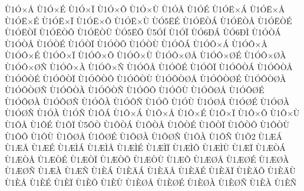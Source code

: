 {^^d91^^d3^^d7^^c5
^^d91^^d3^^d7^^c9
^^d91^^d3^^d7^^cf
^^d91^^d3^^d7^^d5
^^d91^^d3^^d7^^d9
^^d91^^d3^^c5
^^d91^^d3^^c9
^^d91^^d3^^cb^^d7^^c1
^^d91^^d3^^cb^^d7^^c5
^^d91^^d3^^cb^^d7^^c9
^^d91^^d3^^cb^^d7^^cf
^^d91^^d3^^cb^^d7^^d5
^^d91^^d3^^cb^^d7^^d9
^^d9^^d35^^cb^^c9
^^d91^^d3^^cb^^d2^^c1
^^d91^^d3^^cb^^d2^^c5
^^d91^^d3^^cb^^d2^^c9
^^d91^^d3^^cb^^d2^^cf
^^d91^^d3^^cb^^d2^^d5
^^d91^^d3^^cb^^d2^^d9
^^d9^^d35^^cb^^d5
^^d95^^d3^^cd
^^d91^^d3^^cf
^^d9^^d36^^d0^^c1
^^d9^^d36^^d0^^cc
^^d91^^d3^^d2^^c1
^^d91^^d3^^d2^^c5
^^d91^^d3^^d2^^c9
^^d91^^d3^^d2^^cf
^^d91^^d3^^d2^^d5
^^d91^^d3^^d2^^d9
^^d91^^d3^^d4^^c1
^^d91^^d3^^d4^^d7^^c1
^^d91^^d3^^d4^^d7^^c5
^^d91^^d3^^d4^^d7^^c9
^^d91^^d3^^d4^^d7^^cf
^^d91^^d3^^d4^^d7^^d5
^^d91^^d3^^d4^^d7^^d9
^^d91^^d3^^d4^^d7^^d8^^c5
^^d91^^d3^^d4^^d7^^d8^^c9
^^d91^^d3^^d4^^d7^^d8^^c0
^^d91^^d3^^d4^^d7^^d8^^d1
^^d91^^d3^^d4^^d7^^c0
^^d91^^d3^^d4^^d7^^d1
^^d91^^d3^^d4^^c5
^^d91^^d3^^d4^^c9
^^d91^^d3^^d4^^cf
^^d91^^d3^^d4^^d2^^c1
^^d91^^d3^^d4^^d2^^c5
^^d91^^d3^^d4^^d2^^c9
^^d91^^d3^^d4^^d2^^cf
^^d91^^d3^^d4^^d2^^d5
^^d91^^d3^^d4^^d2^^d9
^^d91^^d3^^d4^^d2^^d8^^c5
^^d91^^d3^^d4^^d2^^d8^^c9
^^d91^^d3^^d4^^d2^^d8^^c0
^^d91^^d3^^d4^^d2^^d8^^d1
^^d91^^d3^^d4^^d2^^c0
^^d91^^d3^^d4^^d2^^d1
^^d91^^d3^^d4^^d5
^^d91^^d3^^d4^^d9
^^d91^^d3^^d4^^d8^^c5
^^d91^^d3^^d4^^d8^^c9
^^d91^^d3^^d4^^d8^^c0
^^d91^^d3^^d4^^d8^^d1
^^d91^^d3^^d4^^c0
^^d91^^d3^^d4^^d1
^^d91^^d3^^d5
^^d91^^d3^^d9
^^d91^^d3^^d8^^c5
^^d91^^d3^^d8^^c9
^^d91^^d3^^d8^^c0
^^d91^^d3^^d8^^d1
^^d91^^d3^^c0
^^d91^^d3^^d1
^^d91^^d4^^c1
^^d91^^d4^^d7^^c1
^^d91^^d4^^d7^^c5
^^d91^^d4^^d7^^c9
^^d91^^d4^^d7^^cf
^^d91^^d4^^d7^^d5
^^d91^^d4^^d7^^d9
^^d91^^d4^^c5
^^d91^^d4^^c9
^^d91^^d4^^cf
^^d95^^d4^^d2
^^d91^^d4^^d2^^c1
^^d91^^d4^^d2^^c5
^^d91^^d4^^d2^^c9
^^d91^^d4^^d2^^cf
^^d91^^d4^^d2^^d5
^^d91^^d4^^d2^^d9
^^d91^^d4^^d5
^^d91^^d4^^d9
^^d91^^d4^^d8^^c5
^^d91^^d4^^d8^^c9
^^d91^^d4^^d8^^c0
^^d91^^d4^^d8^^d1
^^d91^^d4^^c0
^^d91^^d4^^d1
^^d91^^d52
^^d91^^c6^^c1
^^d91^^c6^^c5
^^d91^^c6^^c9
^^d91^^c6^^cc^^c1
^^d91^^c6^^cc^^c5
^^d91^^c6^^cc^^c9
^^d91^^c6^^cc^^cf
^^d91^^c6^^cc^^d5
^^d91^^c6^^cc^^d9
^^d91^^c6^^cf
^^d91^^c6^^d2^^c1
^^d91^^c6^^d2^^c5
^^d91^^c6^^d2^^c9
^^d91^^c6^^d2^^cf
^^d91^^c6^^d2^^d5
^^d91^^c6^^d2^^d9
^^d91^^c6^^d5
^^d91^^c6^^d8^^c5
^^d91^^c6^^d8^^c9
^^d91^^c6^^d8^^c0
^^d91^^c6^^d8^^d1
^^d91^^c6^^c0
^^d91^^c6^^d1
^^d91^^c8^^c1
^^d91^^c8^^c4^^c1
^^d91^^c8^^c4^^c5
^^d91^^c8^^c4^^c9
^^d91^^c8^^c4^^cf
^^d91^^c8^^c4^^d5
^^d91^^c8^^c4^^d9
^^d91^^c8^^c5
^^d91^^c8^^c9
^^d91^^c8^^cf
^^d91^^c8^^d5
^^d91^^c8^^d9
^^d91^^c8^^d8^^c5
^^d91^^c8^^d8^^c9
^^d91^^c8^^d8^^c0
^^d91^^c8^^d8^^d1
^^d91^^c8^^c0
^^d91^^c8^^d1
}
